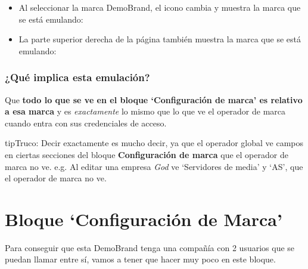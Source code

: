 \documentclass[letterpaper,10pt,spanish]{sphinxmanual}
\begin{document}
\begin{itemize}
\item {} 
Al seleccionar la marca DemoBrand, el icono cambia y muestra la marca que se está emulando:

\end{itemize}

\begin{itemize}
\item {} 
La parte superior derecha de la página también muestra la marca que se está emulando:

\end{itemize}



\subsubsection{¿Qué implica esta emulación?}
\label{internal_calls/god_portal:que-implica-esta-emulacion}
Que \textbf{todo lo que se ve en el bloque `Configuración de marca' es relativo a esa marca} y es \emph{exactamente} lo mismo que lo que ve el operador de marca cuando entra con sus credenciales de acceso.

\begin{notice}{tip}{Truco:}
Decir exactamente es mucho decir, ya que el operador global ve campos en ciertas secciones del bloque \textbf{Configuración de marca} que el operador de marca no ve. e.g. Al editar una empresa \emph{God} ve `Servidores de media' y `AS', que el operador de marca no ve.
\end{notice}


\section{Bloque `Configuración de Marca'}
\label{internal_calls/brand_portal:bloque-configuracion-de-marca}\label{internal_calls/brand_portal::doc}
Para conseguir que esta DemoBrand tenga una compañía con 2 usuarios que se puedan llamar entre sí, vamos a tener que hacer muy poco en este bloque.
\end{document}
